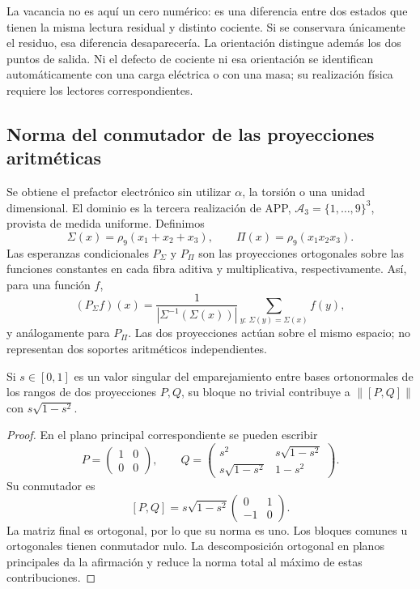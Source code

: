 La vacancia no es aquí un cero numérico: es una diferencia entre dos
estados que tienen la misma lectura residual y distinto cociente. Si se
conservara únicamente el residuo, esa diferencia desaparecería. La
orientación distingue además los dos puntos de salida. Ni el defecto de
cociente ni esa orientación se identifican automáticamente con una carga
eléctrica o con una masa; su realización física requiere los lectores
correspondientes.

\subsection{Norma del conmutador de las proyecciones aritméticas}

Se obtiene el prefactor electrónico sin utilizar \(\alpha\), la torsión
o una unidad dimensional. El dominio es la tercera realización de APP,
\(\mathcal A_3=\{1,\ldots,9\}^3\), provista de medida uniforme.
Definimos
\[
 \Sigma(x)=\rho_9(x_1+x_2+x_3),\qquad
 \Pi(x)=\rho_9(x_1x_2x_3).
\]
Las esperanzas condicionales \(P_\Sigma\) y \(P_\Pi\) son las
proyecciones ortogonales sobre las funciones constantes en cada fibra
aditiva y multiplicativa, respectivamente. Así, para una función \(f\),
\[
 (P_\Sigma f)(x)
 =\frac{1}{|\Sigma^{-1}(\Sigma(x))|}
   \sum_{y:\,\Sigma(y)=\Sigma(x)}f(y),
\]
y análogamente para \(P_\Pi\). Las dos proyecciones actúan sobre el
mismo espacio; no representan dos soportes aritméticos independientes.

\begin{lemma}
Si \(s\in[0,1]\) es un valor singular del emparejamiento entre bases
ortonormales de los rangos de dos proyecciones \(P,Q\), su bloque no
trivial contribuye a \(\|[P,Q]\|\) con
\(s\sqrt{1-s^2}\).
\end{lemma}
\begin{proof}
En el plano principal correspondiente se pueden escribir
\[
 P=\begin{pmatrix}1&0\\0&0\end{pmatrix},\qquad
 Q=\begin{pmatrix}
 s^2&s\sqrt{1-s^2}\\
 s\sqrt{1-s^2}&1-s^2
 \end{pmatrix}.
\]
Su conmutador es
\[
 [P,Q]=s\sqrt{1-s^2}
 \begin{pmatrix}0&1\\-1&0\end{pmatrix}.
\]
La matriz final es ortogonal, por lo que su norma es uno. Los bloques
comunes u ortogonales tienen conmutador nulo. La descomposición ortogonal
en planos principales da la afirmación y reduce la norma total al máximo
de estas contribuciones.
\end{proof}

